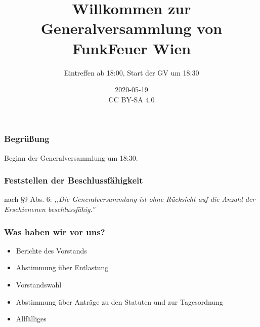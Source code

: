 \documentclass[17pt]{beamer} %
\title[]{Willkommen zur Generalversammlung von FunkFeuer Wien}
\subtitle[]{Eintreffen ab 18:00, Start der GV um 18:30}
\date[]{2020-05-19\\\tiny CC BY-SA 4.0}
\begin{document}
\frame{\titlepage}

%

\begin{frame}
	\frametitle{Begrüßung}
	Beginn der Generalversammlung um 18:30.
\end{frame}



\begin{frame}
	\frametitle{Feststellen der Beschlussfähigkeit}
	nach §9 Abs. 6:
	\textit{,,Die Generalversammlung ist ohne Rücksicht auf die Anzahl der
	Erschienenen beschlussfähig.''}
\end{frame}



\begin{frame}
	\frametitle{Was haben wir vor uns?}
	\begin{itemize}
		\item Berichte des Vorstands
		\item Abstimmung über Entlastung
		\item Vorstandswahl
		\item Abstimmung über Anträge zu den Statuten und zur Tagesordnung
		\item Allfälliges
	\end{itemize}
\end{frame}
\end{document}
